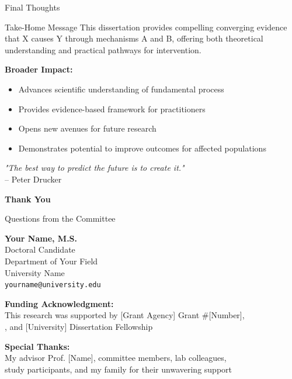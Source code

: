 \documentclass[aspectratio=169,12pt]{beamer}
\begin{document}
\begin{frame}{Final Thoughts}
  \begin{block}{Take-Home Message}
    This dissertation provides compelling converging evidence that X causes Y through mechanisms A and B, offering both theoretical understanding and practical pathways for intervention.
  \end{block}
  
  \vspace{1cm}
  
  \textbf{Broader Impact:}
  \begin{itemize}
    \item Advances scientific understanding of fundamental process
    \item Provides evidence-based framework for practitioners
    \item Opens new avenues for future research
    \item Demonstrates potential to improve outcomes for affected populations
  \end{itemize}
  
  \vspace{1cm}
  
  \begin{center}
    \textit{"The best way to predict the future is to create it."} \\
    -- Peter Drucker
  \end{center}
\end{frame}

\begin{frame}[plain]
  \begin{center}
    {\LARGE \textbf{Thank You}}
    
    \vspace{1cm}
    
    {\Large Questions from the Committee}
    
    \vspace{1.5cm}
    
    \textbf{Your Name, M.S.}\\
    Doctoral Candidate\\
    Department of Your Field\\
    University Name\\
    \texttt{yourname@university.edu}
    
    \vspace{1cm}
    
    {\footnotesize
      \textbf{Funding Acknowledgment:}\\
      This research was supported by [Grant Agency] Grant \#[Number],\\
      [Fellowship Name], and [University] Dissertation Fellowship
      
      \vspace{0.5cm}
      
      \textbf{Special Thanks:}\\
      My advisor Prof. [Name], committee members, lab colleagues,\\
      study participants, and my family for their unwavering support
    }
  \end{center}
\end{frame}
\end{document}
